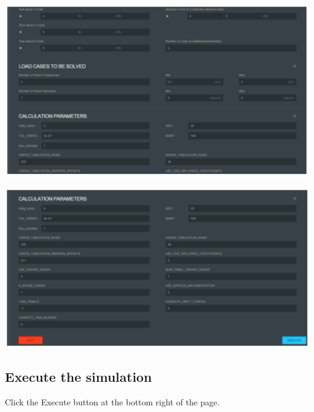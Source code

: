 \documentclass[12pt]{article}
\begin{document}
\vspace{\abovedisplayskip}
\begin{minipage}{\linewidth}
	\centering
	\includegraphics[scale=0.4]{img/27}
\end{minipage}
\vspace{\belowdisplayskip}

\vspace{\abovedisplayskip}
\begin{minipage}{\linewidth}
	\centering
	\includegraphics[scale=0.4]{img/28}
\end{minipage}
\vspace{\belowdisplayskip}

\subsection{ Execute the simulation}
Click the Execute button at the bottom right of the page.
\end{document}
